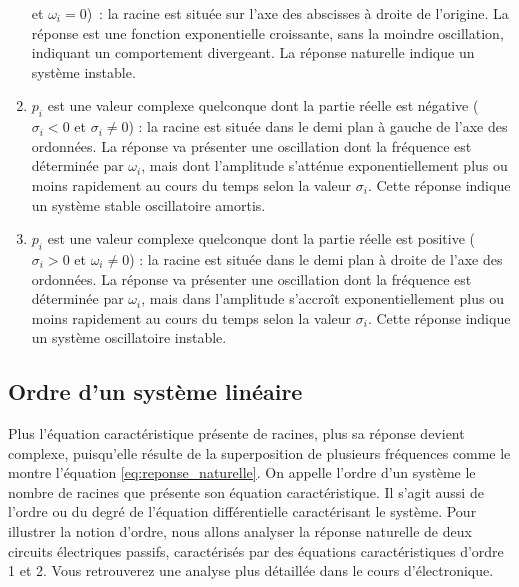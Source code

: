 \begin{remark}{}
\begin{enumerate}
          et $ \omega_i = 0$)~: la racine est située sur l'axe des
          abscisses à droite de l'origine. La réponse est une fonction
          exponentielle croissante, sans la moindre oscillation,
          indiquant un comportement divergeant. La réponse naturelle
          indique un système instable.
        \item $p_{i}$ est une valeur complexe quelconque dont la
          partie réelle est négative ($ \sigma_i< 0$ et
          $\sigma_{i} \neq 0 $) : la racine est située dans le demi
          plan à gauche de l'axe des ordonnées. La réponse va
          présenter une oscillation dont la fréquence est déterminée
          par $ \omega_{i}$, mais dont l'amplitude s'atténue
          exponentiellement plus ou moins rapidement au cours du temps
          selon la valeur $\sigma_{i}$. Cette réponse indique un
          système stable oscillatoire amortis.
        \item $p_{i}$ est une valeur complexe quelconque dont la
          partie réelle est positive ($\sigma_i > 0$ et
          $ \omega_{i} \neq 0 $) : la racine est située dans le demi
          plan à droite de l'axe des ordonnées. La réponse va présenter
          une oscillation dont la fréquence est déterminée par
          $ \omega_{i} $, mais dans l'amplitude s'accroît exponentiellement plus ou
          moins rapidement au cours du temps selon la valeur
          $\sigma_{i}$. Cette réponse indique un système oscillatoire instable.
	\end{enumerate}

	
	
	\subsection{Ordre d'un système linéaire}
	Plus l'équation caractéristique présente de racines, plus sa
        réponse devient complexe, puisqu'elle résulte de la
        superposition de plusieurs fréquences comme le montre
        l'équation \ref{eq:reponse_naturelle}. On appelle l'ordre d'un
        système le nombre de racines que présente son équation
        caractéristique. Il s'agit aussi de l'ordre ou du degré de
        l'équation différentielle caractérisant le système. Pour
        illustrer la notion d'ordre, nous allons analyser la réponse
        naturelle de deux circuits électriques passifs, caractérisés
        par des équations caractéristiques d'ordre 1 et 2. Vous
        retrouverez une analyse plus détaillée dans le cours
        d'électronique.
	

\end{remark}

